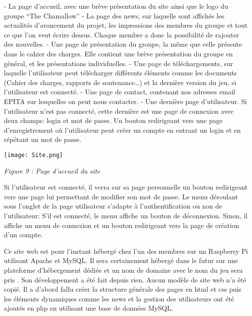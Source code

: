 \documentclass[a4paper]{article}
\begin{document}
 - La page d’accueil, avec une brève présentation du site ainsi que le logo du groupe “The Chamallow”
 - La page des news, sur laquelle sont affichés les actualités d’avancement du projet, les impressions des membres du groupe et tout ce que l’on veut écrire dessus. Chaque membre a donc la possibilité de rajouter des nouvelles.
 - Une page de présentation du groupe, la même que celle présente dans le cahier des charges. Elle contient une brève présentation du groupe en général, et les présentations individuelles.
 - Une page de téléchargements, sur laquelle l’utilisateur peut télécharger différents éléments comme les documents (Cahier des charges, rapports de soutenance…) et la dernière version du jeu, si l’utilisateur est connecté.
 - Une page de contact, contenant nos adresses email EPITA sur lesquelles on peut nous contacter.
 - Une dernière page d’utilisateur. Si l’utilisateur n’est pas connecté, cette dernière est une page de connexion avec deux champs: login et mot de passe. Un bouton redirigeant vers une page d’enregistrement où l’utilisateur peut créer un compte en entrant un login et en répétant un mot de passe.

\quad

\quad

\begin{center}

\texttt{[image: Site.png]}

\quad

\textit {Figure 9 : Page d'accueil du site }

\end{center}


\quad

\newpage

Si l’utilisateur est connecté, il verra sur sa page personnelle un bouton redirigeant vers une page lui permettant de modifier son mot de passe.
Le menu déroulant sous l’onglet de la page utilisateur  s’adapte à l’authentification ou non de l’utilisateur: S’il est connecté, le menu affiche un bouton de déconnexion. Sinon, il affiche un menu de connexion et un bouton redirigeant vers la page de création d’un compte.

Ce site web est pour l’instant hébergé chez l’un des membres sur un Raspberry Pi utilisant Apache et MySQL. Il sera certainement hébergé dans le futur sur une plateforme d’hébergement dédiée et un nom de domaine avec le nom du jeu sera pris
.
Son développement a été fait depuis rien. Aucun modèle de site web n’a été copié. Il a d’abord fallu créer la structure générale des pages en html et css puis les éléments dynamiques comme les news et la gestion des utilisateurs ont été ajoutés en php en utilisant une base de données MySQL.
\end{document}
